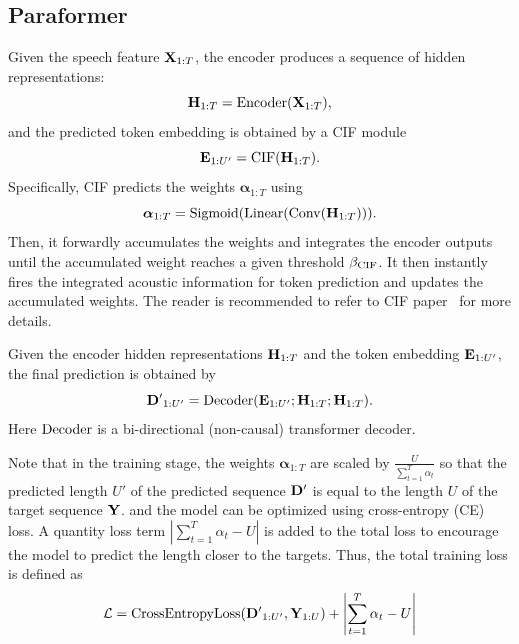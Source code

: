 \documentclass[runningheads]{llncs}
\begin{document}
\subsection{Paraformer}
Given the speech feature ${\bf X}_{1:T}$, the encoder produces a sequence of hidden representations:
\begin{equation}
{\bf H}_{1:T} = {\rm Encoder}({\bf X}_{1:T}),
\end{equation}
and the predicted token embedding is obtained by a CIF module
\begin{equation}
{\bf E}_{1:U'} = {\rm CIF}({\bf H}_{1:T}).
\end{equation}
Specifically, CIF predicts the weights ${\bm \alpha}_{1:T} $ using
\begin{equation}
{\bm \alpha}_{1:T} = {\rm Sigmoid}({\rm Linear}({\rm Conv}({\bf H}_{1:T}))).
\end{equation}
Then, it forwardly accumulates the weights and integrates the encoder outputs until the accumulated weight reaches a given threshold $\beta_{\rm CIF}$.  It then instantly fires the integrated acoustic information for token prediction and updates the accumulated weights.  The reader is recommended to refer to CIF paper~\cite{cif} for more details.

Given the encoder hidden representations ${\bf H}_{1:T}$ and the token embedding ${\bf E}_{1:U'}$,  the final prediction is obtained by
\begin{equation}
{\bf D'}_{1:U'} = {\rm Decoder}({\bf E}_{1:U'}; {\bf H}_{1:T}; {\bf H}_{1:T}).
\end{equation}
Here ${\rm Decoder}$ is a bi-directional (non-causal) transformer decoder. 

Note that in the training stage, the weights ${\bm \alpha}_{1:T}$ are scaled by $\frac{U}{\sum_{t=1}^{T} {\alpha}_t}$ so that the predicted length $U'$ of the predicted sequence ${\bf D'}$ is equal to the length $U$ of the target sequence ${\bf Y}$.  and the model can be optimized using cross-entropy (CE) loss. A quantity loss term $\left| {\sum_{t=1}^{T} {\alpha}_t} - U \right|$ is added to the total loss to encourage the model to predict the length closer to the targets.  Thus, the total training loss is defined as
\begin{equation}
\mathcal{L} = {\rm CrossEntropyLoss}({\bf D'}_{1:U'}, {\bf Y}_{1:U}) + \left| {\sum_{t=1}^{T} {\alpha}_t} - U \right|
\end{equation}
\end{document}
